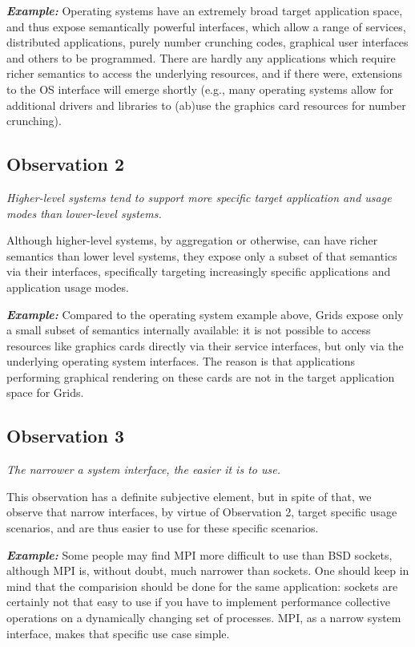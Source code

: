 \documentclass[conference,final]{IEEEtran}
\newcommand{\I}[1]{\textit{#1}}
\newcommand{\B}[1]{\textbf{#1}}
\newcommand{\BI}[1]{\textbf{\textit{#1}}}
\begin{document}
  \BI{Example:} Operating systems have an extremely broad target
  application space, and thus expose semantically powerful interfaces,
  which allow a range of services, distributed applications, purely
  number crunching codes, graphical user interfaces and others to be
  programmed.  There are hardly any applications which require richer
  semantics to access the underlying resources, and if there were,
  extensions to the OS interface will emerge shortly (e.g., many
  operating systems allow for additional drivers and libraries to
  (ab)use the graphics card resources for number crunching).


 \subsection*{\B{Observation 2}} 

  \I{Higher-level systems tend to support more specific target
  application and usage modes than lower-level systems.}

  Although higher-level systems, by aggregation or otherwise, can have
  richer semantics than lower level systems, they expose only a subset
  of that semantics via their interfaces, specifically targeting
  increasingly specific applications and application usage modes.

  \BI{Example:} Compared to the operating system example above, Grids
  expose only a small subset of semantics internally available: it is
  not possible to access resources like graphics cards directly via
  their service interfaces, but only via the underlying operating
  system interfaces.  The reason is that applications performing
  graphical rendering on these cards are not in the target application
  space for Grids.


 \subsection*{\B{Observation 3}} 

  \I{The narrower a system interface, the easier it is to use.}

  This observation has a definite subjective element, but in spite of
  that, we observe that narrow interfaces, by virtue of Observation 2,
  target specific usage scenarios, and are thus easier to use for
  these specific scenarios.

  \BI{Example:} Some people may find MPI more difficult to use than
  BSD sockets, although MPI is, without doubt, much narrower than
  sockets.  One should keep in mind that the comparision should be
  done for the same application: sockets are certainly not that easy
  to use if you have to implement performance collective operations on
  a dynamically changing set of processes.  MPI, as a narrow system
  interface, makes that specific use case simple.
\end{document}
